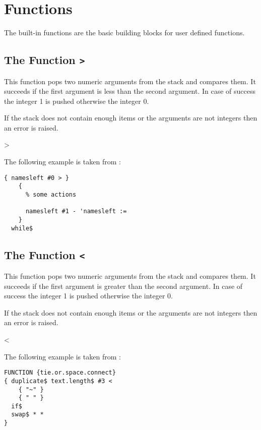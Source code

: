 \section{Functions}

The built-in functions are the basic building blocks for user defined
functions.

\subsection{The Function \texttt{>}}%
\fctIndex{>}

This function pops two numeric arguments from the stack and
compares them. It succeeds if the first argument is less than the
second argument. In case of success the integer 1 is pushed otherwise
the integer 0.

If the stack does not contain enough items or the arguments are not
integers then an error is raised.

\begin{BstFunction}{>}
\end{BstFunction}

The following example is taken from :

\begin{lstlisting}[language=bst]
    { namesleft #0 > }
    { 
      % some actions

      namesleft #1 - 'namesleft :=
    }
  while$
\end{lstlisting}


\subsection{The Function \texttt{<}}%
\fctIndex{<}

This function pops two numeric arguments from the stack and
compares them. It succeeds if the first argument is greater than the
second argument. In case of success the integer 1 is pushed otherwise
the integer 0.

If the stack does not contain enough items or the arguments are not
integers then an error is raised.

\begin{BstFunction}{<}
\end{BstFunction}

The following example is taken from :

\begin{lstlisting}[language=bst]
FUNCTION {tie.or.space.connect}
{ duplicate$ text.length$ #3 <
    { "~" }
    { " " }
  if$
  swap$ * *
}
\end{lstlisting}\fctIndex{<}\fctIndex{*}%


